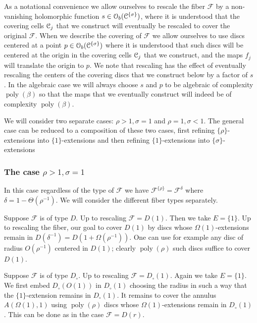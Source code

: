 \documentclass[reqno]{amsart}
\renewcommand\~[1]{\widetilde{#1}}
\def\poly{\operatorname{poly}} \def\J{\operatorname{J}}
\def\cF{{\mathcal F}} \def\cL{{\mathcal L}} \def\cR{{\mathcal R}}
\def\cO{{\mathcal O}}
\def\he#1{{\{#1\}}}
\def\hrho{{\he\rho}}
\def\hsigma{{\he\sigma}}
\begin{document}
As a notational convenience we allow ourselves to rescale the fiber
$\cF$ by a non-vanishing holomorphic function
$s\in\cO_b(\cC^\hsigma)$, where it is understood that the covering
cells ${\mathcal C}_j$ that we construct will eventually be rescaled to cover
the original $\cF$. When we describe the covering of $\cF$ we allow
ourselves to use discs centered at a point $p\in\cO_b(\cC^\hsigma)$
where it is understood that such discs will be centered at the origin
in the covering cells ${\mathcal C}_j$ that we construct, and the maps $f_j$
will translate the origin to $p$. We note that rescaling has the
effect of eventually rescaling the centers of the covering discs that
we construct below by a factor of $s$. In the algebraic case we will
always choose $s$ and $p$ to be algebraic of complexity $\poly(\beta)$
so that the maps that we eventually construct will indeed be of
complexity $\poly(\beta)$.

We will consider two separate cases: $\rho>1,\sigma=1$ and
$\rho=1,\sigma<1$. The general case can be reduced to a composition of
these two cases, first refining $\hrho$-extensions into
$\he1$-extensions and then refining $\he1$-extensions into
$\hsigma$-extensions

\subsubsection{The case $\rho>1,\sigma=1$}
In this case regardless of the type of $\cF$ we have
$\cF^\hrho=\cF^\delta$ where $\delta=1-\Theta(\rho^{-1})$. We will
consider the different fiber types separately.

Suppose $\cF$ is of type $D$. Up to rescaling $\cF=D(1)$.  Then we
take $E=\he1$. Up to rescaling the fiber, our goal to cover $D(1)$ by
discs whose $\Omega(1)$-extensions remain in
$D(\delta^{-1})=D(1+\Omega(\rho^{-1}))$. One can use for example any
disc of radius $O(\rho^{-1})$ centered in $D(1)$; clearly
$\poly(\rho)$ such discs suffice to cover $D(1)$.

Suppose $\cF$ is of type $D_\circ$. Up to rescaling
$\cF=D_\circ(1)$. Again we take $E=\he1$. We first embed
$D_\circ(O(1))$ in $D_\circ(1)$ choosing the radius in such a way that
the $\he1$-extension remains in $D_\circ(1)$. It remains to cover the
annulus $A(\Omega(1),1)$ using $\poly(\rho)$ discs whose
$\Omega(1)$-extensions remain in $D_\circ(1)$. This can be done as in
the case $\cF=D(r)$.
\end{document}
